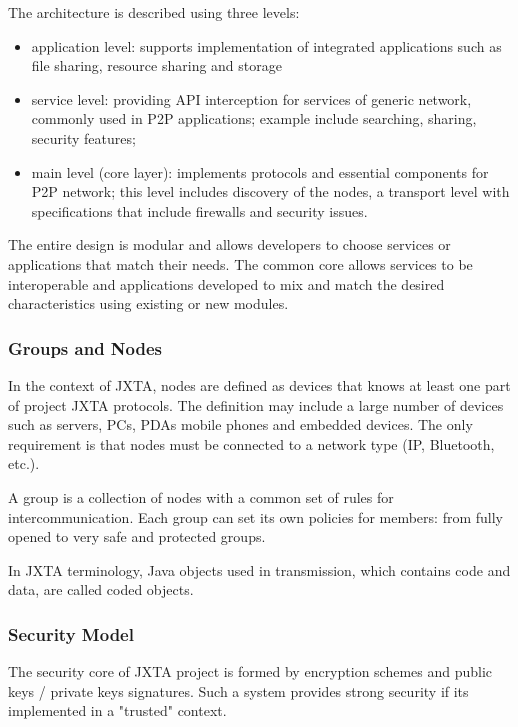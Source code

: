 The architecture is described using three levels:

\begin{itemize}
  \item application level: supports implementation of integrated applications
  such as file sharing, resource sharing and storage
  \item service level: providing API interception for services of generic
  network, commonly used in P2P applications; example include searching, sharing,
  security features;
  \item main level (core layer): implements protocols and essential components
  for P2P network; this level includes discovery of the nodes, a transport level
  with specifications that include firewalls and security issues.
\end{itemize}

The entire design is modular and allows developers to choose services or
applications that match their needs. The common core allows services to be
interoperable and applications developed to mix and match the desired
characteristics using existing or new modules.

\subsubsection{Groups and Nodes}

In the context of JXTA, nodes are defined as devices that knows at least one
part of project JXTA protocols. The definition may include a large number of
devices such as servers, PCs, PDAs mobile phones and embedded devices. The only
requirement is that nodes must be connected to a network type (IP, Bluetooth,
etc.).

A group is a collection of nodes with a common set of rules for
intercommunication. Each group  can set its own policies for members: from
fully opened to very safe and protected groups.

In JXTA terminology, Java objects used in transmission, which contains code and
data, are called coded objects.

\subsubsection{Security Model}

The security core of JXTA project is formed by encryption schemes and public
keys / private keys signatures. Such a system provides strong security if its
implemented in a "trusted" context.

